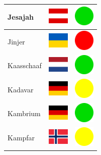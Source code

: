 \documentclass[12pt, a4paper, twoside]{report}
\begin{document}
\begin{center}
\begin{longtable}{|p{5cm}|p{2cm}|p{2cm}|}
Jesajah & \includegraphics[width=1cm]{4x3/at} & \includegraphics[width=1cm]{likes/y} \\ \hline
Jinjer & \includegraphics[width=1cm]{4x3/ua} & \includegraphics[width=1cm]{likes/n} \\ \hline
Kaasschaaf & \includegraphics[width=1cm]{4x3/nl} & \includegraphics[width=1cm]{likes/y} \\ \hline
Kadavar & \includegraphics[width=1cm]{4x3/de} & \includegraphics[width=1cm]{likes/m} \\ \hline
Kambrium & \includegraphics[width=1cm]{4x3/de} & \includegraphics[width=1cm]{likes/y} \\ \hline
Kampfar & \includegraphics[width=1cm]{4x3/no} & \includegraphics[width=1cm]{likes/m} \\ \hline

\end{longtable}
\end{center}
\end{document}
